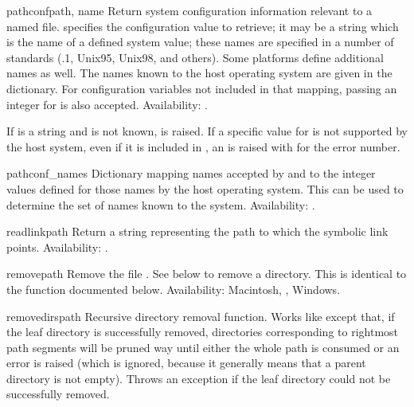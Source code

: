 \begin{funcdesc}{pathconf}{path, name}
Return system configuration information relevant to a named file.
 specifies the configuration value to retrieve; it may be a
string which is the name of a defined system value; these names are
specified in a number of standards (\POSIX.1, Unix95, Unix98, and
others).  Some platforms define additional names as well.  The names
known to the host operating system are given in the
 dictionary.  For configuration variables not
included in that mapping, passing an integer for  is also
accepted.
Availability: \UNIX{}.

If  is a string and is not known,  is
raised.  If a specific value for  is not supported by the
host system, even if it is included in , an
 is raised with  for the
error number.
\end{funcdesc}

\begin{datadesc}{pathconf_names}
Dictionary mapping names accepted by  and
 to the integer values defined for those names
by the host operating system.  This can be used to determine the set
of names known to the system.
Availability: \UNIX.
\end{datadesc}

\begin{funcdesc}{readlink}{path}
Return a string representing the path to which the symbolic link
points.
Availability: \UNIX{}.
\end{funcdesc}

\begin{funcdesc}{remove}{path}
Remove the file .  See  below to remove a
directory.  This is identical to the  function
documented below.
Availability: Macintosh, \UNIX{}, Windows.
\end{funcdesc}

\begin{funcdesc}{removedirs}{path}
Recursive directory removal function.  Works like
 except that, if the leaf directory is
successfully removed, directories corresponding to rightmost path
segments will be pruned way until either the whole path is consumed or
an error is raised (which is ignored, because it generally means that
a parent directory is not empty).  Throws an 
exception if the leaf directory could not be successfully removed.
\end{funcdesc}

